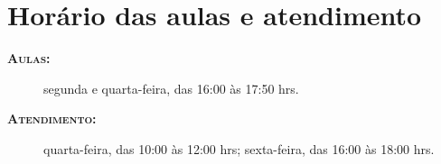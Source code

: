 \section{Horário das aulas e atendimento}

\begin{description}



	\item [\textbf{\textsc{Aulas:}}] segunda e quarta-feira, das 16:00 às 17:50 hrs.

	\item [\textbf{\textsc{Atendimento:}}] quarta-feira, das 10:00 às 12:00 hrs; sexta-feira, das 16:00 às 18:00 hrs.

\end{description}
